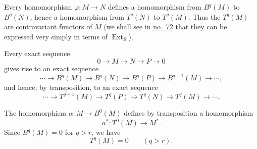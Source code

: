 \label{fac:III:4:no:70:property:T-functoriality}
Every homomorphism $\varphi:M\longrightarrow N$ defines a homomorphism
from $B^q(M)$ to $B^q(N)$, hence a homomorphism from $T^q(N)$ to
$T^q(M)$. Thus the $T^q(M)$ are contravariant functors of $M$ (we shall
see in \hyperref[fac:III:4:no:72]{no.~72} that they can be expressed very
simply in terms of
$\operatorname{Ext}_S$).

Every exact sequence
\label{fac:III:4:no:70:formula:short-exact}
\[
0\longrightarrow M\longrightarrow N\longrightarrow P\longrightarrow0
\]
gives rise to an exact sequence
\label{fac:III:4:no:70:formula:long-exact-B}
\[
\cdots\longrightarrow B^q(M)\longrightarrow B^q(N)
\longrightarrow B^q(P)\longrightarrow B^{q+1}(M)
\longrightarrow\cdots,
\]
and hence, by transposition, to an exact sequence
\label{fac:III:4:no:70:formula:long-exact-T}
\[
\cdots\longrightarrow T^{q+1}(M)\longrightarrow T^q(P)
\longrightarrow T^q(N)\longrightarrow T^q(M)
\longrightarrow\cdots.
\]

The homomorphism
\hyperref[fac:III:4:no:69:map:alpha]{$\alpha:M\longrightarrow B^0(M)$}
defines by transposition a homomorphism
\label{fac:III:4:no:70:map:alpha-star}
\[
\alpha^*:T^0(M)\longrightarrow M^*.
\]
\label{fac:III:4:no:70:property:B-vanishing}
Since $B^q(M)=0$ for $q>r$, we have
\label{fac:III:4:no:70:formula:vanishing}
\[
T^q(M)=0\qquad(q>r).
\]
